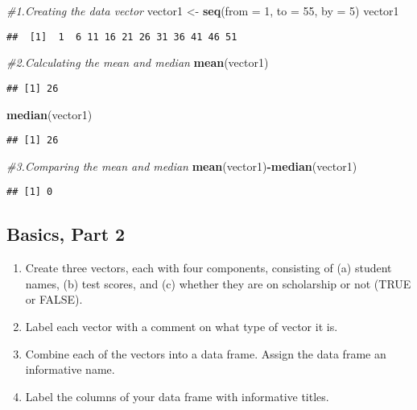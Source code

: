 \documentclass[
]{article}
\newenvironment{Shaded}{\begin{snugshade}}{\end{snugshade}}
\newcommand{\AttributeTok}[1]{\textcolor[rgb]{0.13,0.29,0.53}{#1}}
\newcommand{\CommentTok}[1]{\textcolor[rgb]{0.56,0.35,0.01}{\textit{#1}}}
\newcommand{\DecValTok}[1]{\textcolor[rgb]{0.00,0.00,0.81}{#1}}
\newcommand{\FunctionTok}[1]{\textcolor[rgb]{0.13,0.29,0.53}{\textbf{#1}}}
\newcommand{\NormalTok}[1]{#1}
\newcommand{\OtherTok}[1]{\textcolor[rgb]{0.56,0.35,0.01}{#1}}
\newcommand{\SpecialCharTok}[1]{\textcolor[rgb]{0.81,0.36,0.00}{\textbf{#1}}}
\begin{document}
\begin{Shaded}
\begin{Highlighting}[]
\CommentTok{\#1.Creating the data vector}
\NormalTok{vector1 }\OtherTok{\textless{}{-}} \FunctionTok{seq}\NormalTok{(}\AttributeTok{from =} \DecValTok{1}\NormalTok{, }\AttributeTok{to =} \DecValTok{55}\NormalTok{, }\AttributeTok{by =} \DecValTok{5}\NormalTok{)}
\NormalTok{vector1}
\end{Highlighting}
\end{Shaded}

\begin{verbatim}
##  [1]  1  6 11 16 21 26 31 36 41 46 51
\end{verbatim}

\begin{Shaded}
\begin{Highlighting}[]
\CommentTok{\#2.Calculating the mean and median}
\FunctionTok{mean}\NormalTok{(vector1)}
\end{Highlighting}
\end{Shaded}

\begin{verbatim}
## [1] 26
\end{verbatim}

\begin{Shaded}
\begin{Highlighting}[]
\FunctionTok{median}\NormalTok{(vector1)}
\end{Highlighting}
\end{Shaded}

\begin{verbatim}
## [1] 26
\end{verbatim}

\begin{Shaded}
\begin{Highlighting}[]
\CommentTok{\#3.Comparing the mean and median}
\FunctionTok{mean}\NormalTok{(vector1)}\SpecialCharTok{{-}}\FunctionTok{median}\NormalTok{(vector1)}
\end{Highlighting}
\end{Shaded}

\begin{verbatim}
## [1] 0
\end{verbatim}

\subsection{Basics, Part 2}\label{basics-part-2}

\begin{enumerate}
\def\labelenumi{\arabic{enumi}.}
\setcounter{enumi}{4}
\item
  Create three vectors, each with four components, consisting of (a)
  student names, (b) test scores, and (c) whether they are on
  scholarship or not (TRUE or FALSE).
\item
  Label each vector with a comment on what type of vector it is.
\item
  Combine each of the vectors into a data frame. Assign the data frame
  an informative name.
\item
  Label the columns of your data frame with informative titles.
\end{enumerate}
\end{document}
